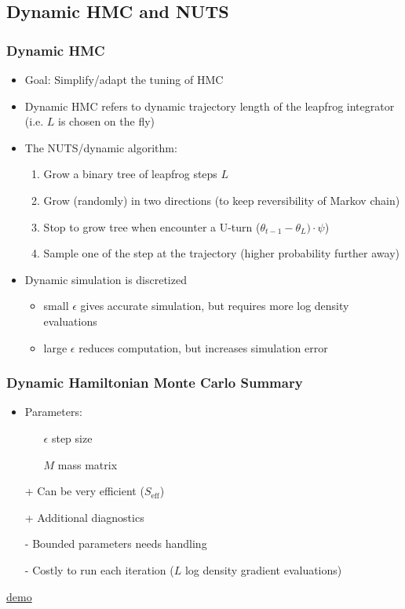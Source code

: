 \documentclass[10pt]{beamer}
\newcommand{\uured}[1]{\textcolor{uured}{#1}}
\begin{document}



\subsection{Dynamic HMC and NUTS}

\begin{frame}
\frametitle{Dynamic HMC}

  \begin{itemize}
  \item \uured{Goal:} Simplify/adapt the tuning of HMC
  \item \uured{Dynamic} HMC refers to \uured{dynamic} trajectory length of the leapfrog integrator (i.e. $L$ is chosen on the fly) \pause
  \item The NUTS/dynamic algorithm:
  \begin{enumerate}
    \item Grow a binary tree of leapfrog steps $L$
    \item Grow (randomly) in two directions (to keep reversibility of Markov chain)
    \item Stop to grow tree when encounter a U-turn ($\theta_{t-1}-\theta_L)\cdot\psi$)
    \item Sample one of the step at the trajectory (higher probability further away)
  \end{enumerate}
  \pause
  \item Dynamic simulation is discretized
  \begin{itemize}
    \item small $\epsilon$ gives accurate simulation, but requires more log density evaluations
    \item large $\epsilon$ reduces computation, but increases
      simulation error
    \end{itemize}
\end{itemize}

\end{frame}

\begin{frame}
\frametitle{Dynamic Hamiltonian Monte Carlo Summary}

\begin{itemize}
\item Parameters:
\begin{itemize}
\item[$\epsilon$] step size \pause
\item[$M$] mass matrix\pause
\end{itemize}
\item[+] Can be very efficient ($S_\text{eff}$)
\item[+] Additional diagnostics
\pause
\item[-] Bounded parameters needs handling
\item[-] Costly to run each iteration ($L$ log density gradient evaluations)
\pause
\end{itemize}

\centering
\href{https://chi-feng.github.io/mcmc-demo/app.html?algorithm=EfficientNUTS&target=standard}{demo}

\end{frame}
\end{document}
